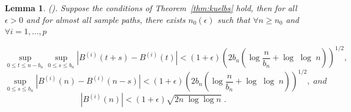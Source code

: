 \documentclass[11pt]{article}
\newtheorem{lemma}{Lemma}
\theoremstyle{remark}
\begin{document}
\begin{lemma}
\label{lemma: brownian}
(\cite{csorgo2014strong}). Suppose the conditions of Theorem~\ref{thm:kuelbs} hold, then for all $\epsilon > 0$ and for almost all sample paths, there exists $n_{0}\left(\epsilon\right)$ such that $\forall n\geq n_{0}$ and $\forall i = 1, ..., p$

\[
\sup_{0\leq t \leq n-b_n}\sup_{0 \leq s \leq b_n} \left| B^{\left(i\right)}\left(t+s\right) - B^{\left(i\right)}\left(t\right) \right| < \left(1+ \epsilon\right)\left(2b_n\left(\log\dfrac{n}{b_n} + \log\; \log\; n\right)\right)^{1/2} ,
\]
%
\[
\sup_{0 \leq s \leq b_n} \left|B^{\left(i\right)}\left(n\right) - B^{\left(i\right)}\left(n - s\right)\right| < \left(1+ \epsilon\right)\left(2b_n\left(\log\dfrac{n}{b_n} + \log\;\log\;n\right)\right)^{1/2} , \;and
\]
%
\[
\left|B^{\left(i\right)}\left(n\right)\right| < \left(1+\epsilon\right)\sqrt{2n\;\log \log n} \; . 
\]
\end{lemma}



\end{document}
